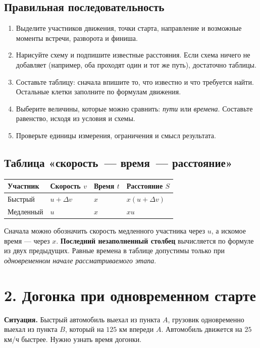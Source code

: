 \documentclass[a4paper,12pt]{article}
\newcommand{\key}[1]{\textcolor{darkaccent}{\textbf{#1}}}
\begin{document}
\subsection*{Правильная последовательность}
\begin{enumerate}
\item Выделите участников движения, точки старта, направление и возможные моменты встречи, разворота и финиша.
\item Нарисуйте схему и подпишите известные расстояния. Если схема ничего не добавляет (например, оба проходят один и тот же путь), достаточно таблицы.
\item Составьте таблицу: сначала впишите то, что известно и что требуется найти. Остальные клетки заполните по формулам движения.
\item Выберите величины, которые можно сравнить: \emph{пути} или \emph{времена}. Составьте равенство, исходя из условия и схемы.
\item Проверьте единицы измерения, ограничения и смысл результата.
\end{enumerate}

\subsection*{Таблица «скорость~--- время~--- расстояние»}
\begin{center}
\renewcommand{\arraystretch}{1.45}
\begin{tabularx}{\linewidth}{@{}lXXX@{}}
\toprule
Участник & Скорость $v$ & Время $t$ & Расстояние $S$\\
\midrule
Быстрый & $u+\Delta v$ & $x$ & $x(u+\Delta v)$\\
Медленный & $u$ & $x$ & $xu$\\
\bottomrule
\end{tabularx}
\end{center}
Сначала можно обозначить скорость медленного участника через $u$, а искомое время --- через $x$. \key{Последний незаполненный столбец} вычисляется по формуле из двух предыдущих. Равные времена в таблице допустимы только при \emph{одновременном начале рассматриваемого этапа}.

\section*{2. Догонка при одновременном старте}

\textbf{Ситуация.} Быстрый автомобиль выехал из пункта $A$, грузовик одновременно выехал из пункта $B$, который на $125$ км впереди $A$. Автомобиль движется на $25$ км/ч быстрее. Нужно узнать время догонки.
\end{document}
